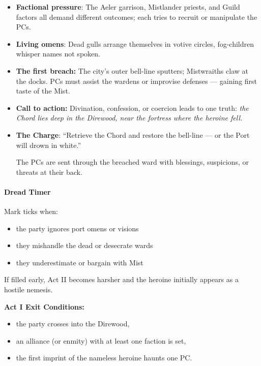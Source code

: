 \documentclass[11pt]{article}
\begin{document}
\begin{itemize}
  \item \textbf{Factional pressure}:  
  The Aeler garrison, Mistlander priests, and Guild factors all demand different outcomes; each tries to recruit or manipulate the PCs.
  
  \item \textbf{Living omens}:  
  Dead gulls arrange themselves in votive circles, fog-children whisper names not spoken.
  
  \item \textbf{The first breach:}  
  The city's outer bell-line sputters; Mistwraiths claw at the docks. PCs must assist the wardens or improvise defenses --- gaining first taste of the Mist.
  
  \item \textbf{Call to action:}  
  Divination, confession, or coercion leads to one truth:
  \emph{the Chord lies deep in the Direwood,  
  near the fortress where the heroine fell.}
  
  \item \textbf{The Charge}:  
  ``Retrieve the Chord and restore the bell-line ---  
  or the Port will drown in white.''
  
  The PCs are sent through the breached ward with blessings, suspicions,  
  or threats at their back.
\end{itemize}

\paragraph{Dread Timer }
Mark ticks when:
\begin{itemize}
    \item the party ignores port omens or visions
    \item they mishandle the dead or desecrate wards
    \item they underestimate or bargain with Mist
\end{itemize}

If filled early, Act II becomes harsher and  
the heroine initially appears as a hostile nemesis.

\vspace{0.5em}

\noindent\textbf{Act I Exit Conditions:}
\begin{itemize}
    \item the party crosses into the Direwood,
    \item an alliance (or enmity) with at least one faction is set,
    \item the first imprint of the nameless heroine haunts one PC.
\end{itemize}
\end{document}

